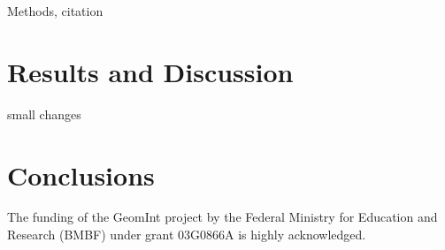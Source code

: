 \documentclass{svjour3}                     %
\begin{document}
Methods, citation \cite{Shirzadi2017a}

\section{Results and Discussion}
\label{sec:results}

small changes

\section{Conclusions}
\label{sec:conclusions}

\begin{acknowledgements}
The funding of the GeomInt project by the Federal Ministry for Education and Research (BMBF) under grant 03G0866A is highly acknowledged.
\end{acknowledgements}
%
%

%
\end{document}
